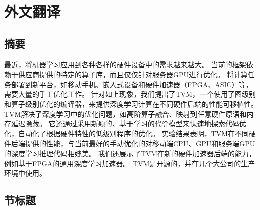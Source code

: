 \cleardoublepage
\chapter{外文翻译}

\section*{摘要}

最近，将机器学习应用到各种各样的硬件设备中的需求越来越大。
当前的框架依赖于供应商提供的特定的算子库，而且仅仅针对服务器GPU进行优化。
将计算任务部署到新平台，如移动手机、嵌入式设备和硬件加速器（FPGA、ASIC）等，需要大量的手工优化工作。
针对如上现象，我们提出了TVM，一个使用了图级别和算子级别优化的编译器，来提供深度学习计算在不同硬件后端的性能可移植性。
TVM解决了深度学习中的优化问题，如高阶算子融合、映射到任意硬件原语和内存延迟隐藏。
它还通过采用新颖的、基于学习的代价模型来快速地探索代码优化，自动化了根据硬件特性的低级别程序的优化。
实验结果表明，TVM在不同硬件后端提供的性能，与当前最好的手动优化的对移动端CPU、GPU和服务端GPU的深度学习推理代码相媲美。
我们还展示了TVM在新的硬件加速器后端的能力，例如基于FPGA的通用深度学习加速器。
TVM是开源的，并在几个大公司的生产环境中使用。

\section{节标题}
